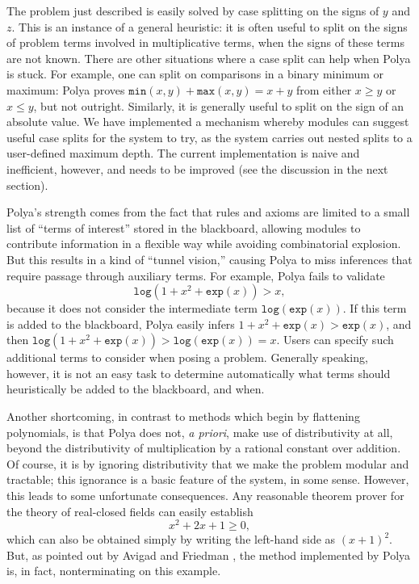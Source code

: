 \documentclass[runningheds]{llncs}
\newcommand{\fn}[1]{\mathtt{#1}} \newcommand{\nroot}{\fn{root}}
\begin{document}
The problem just described is easily solved by case splitting on the signs of $y$ and $z$. This is an instance of a general heuristic: it is often useful to split on the signs of problem terms involved in multiplicative terms, when the signs of these terms are not known. There are other situations where a case split can help when Polya is stuck. For example, one can split on comparisons in a binary minimum or maximum: Polya proves $\fn{min}(x, y) + \fn{max}(x, y) = x + y$ from either $x \geq y$ or $x \leq y$, but not outright. Similarly, it is generally useful to split on the sign of an absolute value. We have implemented a mechanism whereby modules can suggest useful case splits for the system to try, as the system carries out nested splits to a user-defined maximum depth. The current implementation is naive and inefficient, however, and needs to be improved (see the discussion in the next section).

Polya's strength comes from the fact that rules and axioms are limited to a small list of ``terms of interest'' stored in the blackboard, allowing modules to contribute information in a flexible way while avoiding combinatorial explosion. But this results in a kind of ``tunnel vision,'' causing Polya to miss inferences that require passage through auxiliary terms. For example, Polya fails to validate
\begin{equation}
\fn{log}(1 + x^2 + \fn{exp}(x)) > x,  
\end{equation}
because it does not consider the intermediate term $\fn{log}(\fn{exp}(x))$. If this term is added to the blackboard, Polya easily infers $1 + x^2 + \fn{exp}(x) > \fn{exp}(x)$, and then $\fn{log}(1 + x^2 + \fn{exp}(x)) > \fn{log}(\fn{exp}(x)) = x$. Users can specify such additional terms to consider when posing a problem. Generally speaking, however, it is not an easy task to determine automatically what terms should heuristically be added to the blackboard, and when.

Another shortcoming, in contrast to methods which begin by flattening polynomials, is that Polya does not, \emph{a priori}, make use of distributivity at all, beyond the distributivity of multiplication by a rational constant over addition. Of course, it is by ignoring distributivity that we make the problem modular and tractable; this ignorance is a basic feature of the system, in some sense. However, this leads to some unfortunate consequences. Any reasonable theorem prover for the theory of real-closed fields can easily establish
\begin{equation}
 x^2 + 2 x + 1 \geq 0,
\end{equation}
which can also be obtained simply by writing the left-hand side as $(x + 1)^2$. But, as pointed out by Avigad and Friedman \cite{avigad:friedman:06}, the method implemented by Polya is, in fact, nonterminating on this example.
\end{document}

